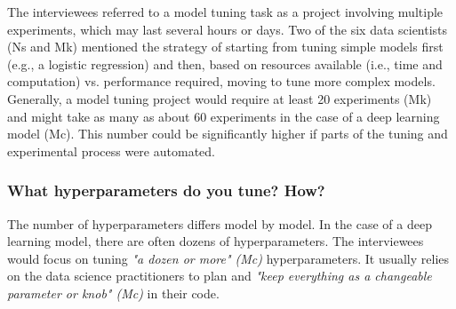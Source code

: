 \documentclass[preprint]{vgtc}        %
\newcommand{\tristan}[1]{{{#1}}}
\begin{document}
The interviewees referred to a model tuning task as a project involving multiple experiments, which may last several hours or days. Two of the six data scientists (Ns and Mk) mentioned the strategy of starting from tuning simple models first (e.g., a logistic regression) and then, based on resources available (i.e., time and computation) vs. performance required, moving to tune more complex models. Generally, a model tuning project would require at least 20 experiments (Mk) and might take as many as about 60 experiments in the case of a deep learning model (Mc). This number could be significantly higher if parts of the tuning and experimental process were automated.
\subsubsection{What hyperparameters do you tune? How?}
The number of hyperparameters differs model by model. In the case of a deep learning model, there are often dozens of hyperparameters. 
The interviewees would focus on tuning \textit{"a dozen or more" (Mc)} hyperparameters. It usually relies on the data science practitioners to plan and \textit{"keep everything as a changeable parameter or knob" (Mc)} in their code.
\end{document}
